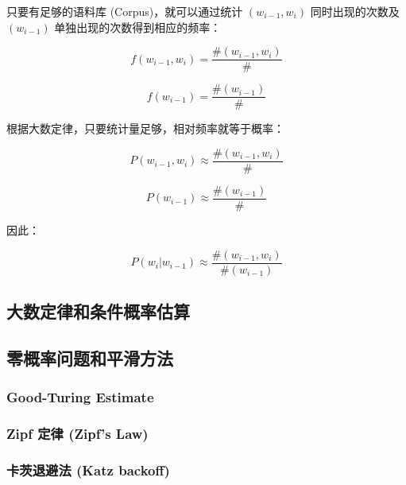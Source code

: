 \documentclass[11pt]{article}
\begin{document}
只要有足够的语料库 (Corpus)，就可以通过统计 \((w_{i-1},w_{i})\) 同时出现的次数及 \((w_{i-1})\) 单独出现的次数得到相应的频率：

\begin{equation}
f(w_{i-1},w_{i}) = \frac{\#(w_{i-1},w_{i})}{\#}
\end{equation}

\begin{equation}
f(w_{i-1}) = \frac{\#(w_{i-1})}{\#}
\end{equation}

根据大数定律，只要统计量足够，相对频率就等于概率：

\begin{equation}
P(w_{i-1},w_{i}) \approx \frac{\#(w_{i-1},w_{i})}{\#}
\end{equation}

\begin{equation}
P(w_{i-1}) \approx \frac{\#(w_{i-1})}{\#}
\end{equation}

因此：

\begin{equation}
P(w_{i}|w_{i-1}) \approx \frac{\#(w_{i-1},w_{i})}{\#(w_{i-1})}
\end{equation}

\subsection{大数定律和条件概率估算}
\label{sec:org1bdffae}

\subsection{零概率问题和平滑方法}
\label{sec:org97afd08}

\subsubsection{Good-Turing Estimate}
\label{sec:org36315f2}

\subsubsection{Zipf 定律 (Zipf's Law)}
\label{sec:orgd6f846e}

\subsubsection{卡茨退避法 (Katz backoff)}
\label{sec:orgadde8aa}
\end{document}
